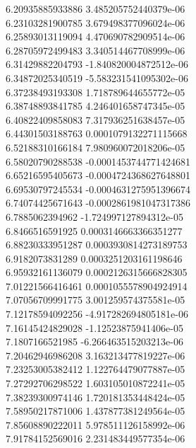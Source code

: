{6.20935885933886 3.485205752440379e-06 \\
6.23103281900785 3.679498377096024e-06 \\
6.25893013119094 4.470690782909514e-06 \\
6.28705972499483 3.340514467708999e-06 \\
6.31429882204793 -1.840820004872512e-06 \\
6.34872025340519 -5.583231541095302e-06 \\
6.37238493193308 1.718789644655772e-05 \\
6.38748893841785 4.246401658747345e-05 \\
6.40822409858083 7.317936251638457e-05 \\
6.44301503188763 0.0001079132271115668 \\
6.52188310166184 7.980960072018206e-05 \\
6.58020790288538 -0.0001453744771424681 \\
6.65216595405673 -0.0004724368627648801 \\
6.69530797245534 -0.0004631275951396674 \\
6.74074425671643 -0.0002861981047317386 \\
6.7885062394962 -1.724997127894312e-05 \\
6.8466516591925 0.0003146663366351277 \\
6.88230333951287 0.0003930814273189753 \\
6.9182073831289 0.0003251203161198646 \\
6.95932161136079 0.0002126315666828305 \\
7.01221566416461 0.0001055578904924914 \\
7.07056709991775 3.001259574375581e-05 \\
7.12178594092256 -4.917282694805181e-06 \\
7.16145424829028 -1.12523875941406e-05 \\
7.1807166521985 -6.266463515203213e-06 \\
7.20462946986208 3.163213477819227e-06 \\
7.23253005382412 1.122764479077887e-05 \\
7.27292706298522 1.603105010872241e-05 \\
7.38239300974146 1.720181353448424e-05 \\
7.58950217871006 1.437877381249564e-05 \\
7.85608890222011 5.978511126158992e-06 \\
7.91784152569016 2.231483449577354e-06 \\
}
